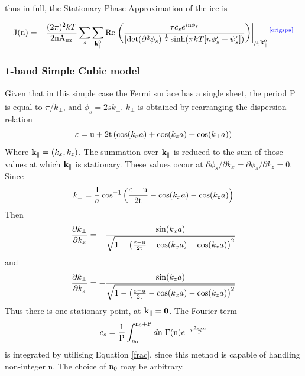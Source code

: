 \documentclass[a4paper, 12pt]{article}
\newcommand{\site}[1]{\textsuperscript{\textcolor{blue}{\cite{#1}}}}
\begin{document}
\normalsize \justify \quad 
thus in full, the Stationary Phase Approximation of the \gls{iec} is

\begin{equation}\label{spa}
	{\rm J(n)} = -\frac{(2\pi)^2{kT}}{2{\rm nA_{\scriptscriptstyle BZ}}}\sum_s \sum_{{\bf k}_\parallel^0}{\rm Re}\left.\left(\frac{\tau  c_se^{i{\rm n}\phi_s}}{\vert {\rm det}(\partial^2\phi_s)\vert^\frac{1}{2}\sinh(\pi kT[n\phi_s '+\psi_s '])} \right) \right|_{\mu , {\bf k}_\parallel^0}\site{origspa}
\end{equation}
\subsubsection{1-band Simple Cubic model}
	Given that in this simple case the Fermi surface has a single sheet, the period P is equal to $\pi/k_\perp$, and $\phi_s = 2sk_\perp$\textcolor{blue}{\textsuperscript{\cite{rev3}}}.
	$k_\perp$ is obtained by rearranging the dispersion relation
	\begin{equation}\label{dispersion}
		\varepsilon = {\rm u + 2t}\left(\cos(k_x a) + \cos(k_z a)+\cos(k_\perp a)\right)	
	\end{equation}
	Where ${\bf k}_\parallel = (k_x, k_z)$. 
	The summation over $\rm\bf k_\parallel$ is reduced to the sum of those values at which $\rm\bf k_\parallel$ is stationary. These values occur at $\partial\phi_s/\partial k_x= \partial\phi_s/\partial k_z= 0$.
	Since
	\begin{equation}
		k_\perp \rm= \frac{1}{\mathnormal a}\cos^{-1}\Big(\frac{\varepsilon - u}{2t} - \mathnormal{\cos(k_x  a)-\cos(k_z  a)}\Big)
	\end{equation}
	Then
	\begin{equation}
		\frac{\partial k_\perp}{\partial k_x} = -\frac{\sin(k_x a)}{\sqrt{1-\left(\frac{\varepsilon -{\rm u}}{2{\rm t}}-\cos(k_x a)-\cos(k_z a)\right)^2}}
	\end{equation}
	and
	\begin{equation}
		\frac{\partial k_\perp}{\partial k_z} = -\frac{\sin(k_z a)}{\sqrt{1-\left(\frac{\varepsilon -{\rm u}}{2{\rm t}}-\cos(k_x a)-\cos(k_z a)\right)^2}}
	\end{equation}
	Thus there is one stationary point, at $\rm\bf k_\parallel = 0$.
	The Fourier term
	\begin{equation}
		c_s= \frac{1}{\rm P} \int_{{\rm n}_0}^{{\rm n}_0+{\rm P}} d{\rm n \;F(n)}e^{- i\frac{2\pi s \rm n}{\rm P}}
	\end{equation}
	is integrated by utilising Equation \eqref{frac}, since this method is capable of handling non-integer n. The choice of $\rm n_0$ may be arbitrary.
\end{document}
